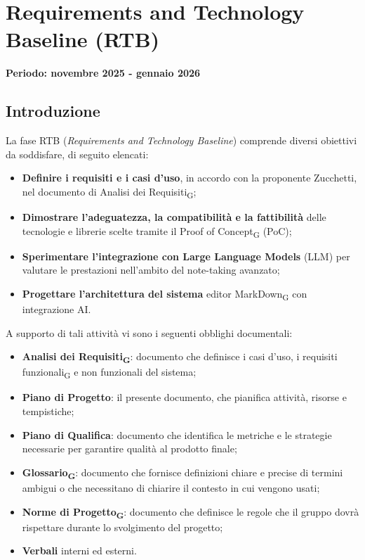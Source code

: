 \documentclass[11pt,a4paper]{article}
\newcommand{\gls}[1]{#1\textsubscript{G}}
\begin{document}
\section{Requirements and Technology Baseline (RTB)}
\small\textbf{Periodo: novembre 2025 - gennaio 2026}

\subsection{Introduzione}
La fase RTB (\textit{Requirements and Technology Baseline}) comprende diversi obiettivi da soddisfare, di seguito elencati:

\begin{itemize}
    \item \textbf{Definire i requisiti e i casi d'uso}, in accordo con la proponente Zucchetti, nel documento di \gls{Analisi dei Requisiti};
    \item \textbf{Dimostrare l'adeguatezza, la compatibilità e la fattibilità} delle tecnologie e librerie scelte tramite il Proof of Concept\textsubscript{G} (PoC);
    \item \textbf{Sperimentare l'integrazione con Large Language Models} (LLM) per valutare le prestazioni nell'ambito del note-taking avanzato;
    \item \textbf{Progettare l'architettura del sistema} editor \gls{MarkDown} con integrazione AI.
\end{itemize}

\noindent A supporto di tali attività vi sono i seguenti obblighi documentali:

\begin{itemize}
    \item \textbf{\gls{Analisi dei Requisiti}}: documento che definisce i casi d'uso, i \gls{requisiti funzionali} e non funzionali del sistema;
    \item \textbf{Piano di Progetto}: il presente documento, che pianifica attività, risorse e tempistiche;
    \item \textbf{Piano di Qualifica}: documento che identifica le metriche e le strategie necessarie per garantire qualità al prodotto finale;
    \item \textbf{\gls{Glossario}}: documento che fornisce definizioni chiare e precise di termini ambigui o che necessitano di chiarire il contesto in cui vengono usati;
    \item \textbf{\gls{Norme di Progetto}}: documento che definisce le regole che il gruppo dovrà rispettare durante lo svolgimento del progetto;
    \item \textbf{Verbali} interni ed esterni.
\end{itemize}
\end{document}
